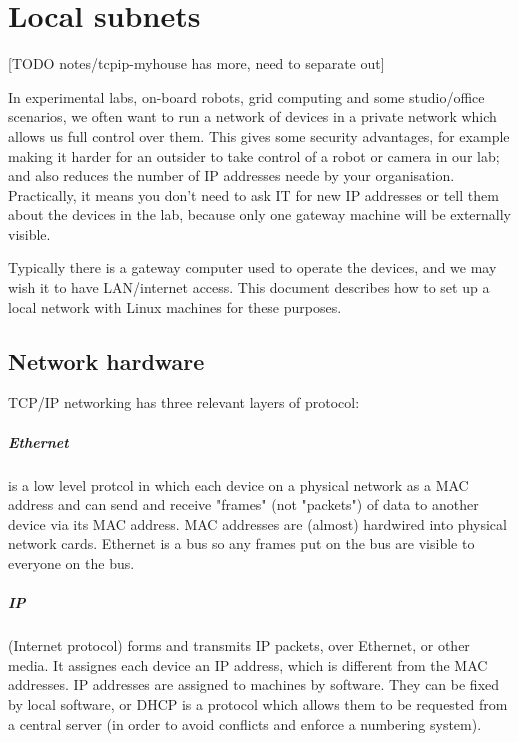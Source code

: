 \documentclass[oneside,english]{scrbook}
\begin{document}
\chapter{Local subnets}

[TODO notes/tcpip-myhouse has more, need to separate out]


In experimental labs, on-board robots, grid computing and some studio/office scenarios, we
often want to run a network of devices in a private network which
allows us full control over them.  This gives some security advantages, for example making it harder for an outsider to take control of a robot or camera in our lab; and also reduces the number of IP addresses neede by your organisation. Practically, it means you don't need to ask IT for new IP addresses or tell them about the devices in the lab, because only one gateway machine will be externally visible.

Typically there is a gateway computer
used to operate the devices, and we may wish
it to have LAN/internet access. This document describes how to set up
a local network with Linux machines for these purposes.


\section{Network hardware}

TCP/IP networking has three relevant layers of protocol:

\paragraph{Ethernet} is a low level protcol in which each device on a physical network as a MAC address and can send and receive "frames" (not "packets") of data to another device via its MAC address. MAC addresses are (almost) hardwired into physical network cards. Ethernet is a bus so any frames put on the bus are visible to everyone on the bus.

\paragraph{IP} (Internet protocol) forms and transmits IP packets, over Ethernet, or other media.  It assignes each device an IP address, which is different from the MAC addresses. IP addresses are assigned to machines by software. They can be fixed by local software, or DHCP is a protocol which allows them to be requested from a central server (in order to avoid conflicts and enforce a numbering system).
\end{document}
